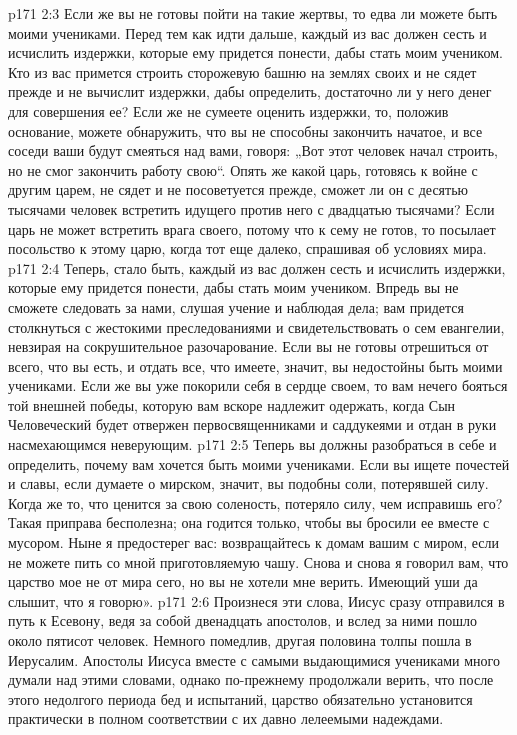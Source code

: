 \vs p171 2:3 Если же вы не готовы пойти на такие жертвы, то едва ли можете быть моими учениками. Перед тем как идти дальше, каждый из вас должен сесть и исчислить издержки, которые ему придется понести, дабы стать моим учеником. Кто из вас примется строить сторожевую башню на землях своих и не сядет прежде и не вычислит издержки, дабы определить, достаточно ли у него денег для совершения ее? Если же не сумеете оценить издержки, то, положив основание, можете обнаружить, что вы не способны закончить начатое, и все соседи ваши будут смеяться над вами, говоря: „Вот этот человек начал строить, но не смог закончить работу свою“. Опять же какой царь, готовясь к войне с другим царем, не сядет и не посоветуется прежде, сможет ли он с десятью тысячами человек встретить идущего против него с двадцатью тысячами? Если царь не может встретить врага своего, потому что к сему не готов, то посылает посольство к этому царю, когда тот еще далеко, спрашивая об условиях мира.
\vs p171 2:4 Теперь, стало быть, каждый из вас должен сесть и исчислить издержки, которые ему придется понести, дабы стать моим учеником. Впредь вы не сможете следовать за нами, слушая учение и наблюдая дела; вам придется столкнуться с жестокими преследованиями и свидетельствовать о сем евангелии, невзирая на сокрушительное разочарование. Если вы не готовы отрешиться от всего, что вы есть, и отдать все, что имеете, значит, вы недостойны быть моими учениками. Если же вы уже покорили себя в сердце своем, то вам нечего бояться той внешней победы, которую вам вскоре надлежит одержать, когда Сын Человеческий будет отвержен первосвященниками и саддукеями и отдан в руки насмехающимся неверующим.
\vs p171 2:5 Теперь вы должны разобраться в себе и определить, почему вам хочется быть моими учениками. Если вы ищете почестей и славы, если думаете о мирском, значит, вы подобны соли, потерявшей силу. Когда же то, что ценится за свою соленость, потеряло силу, чем исправишь его? Такая приправа бесполезна; она годится только, чтобы вы бросили ее вместе с мусором. Ныне я предостерег вас: возвращайтесь к домам вашим с миром, если не можете пить со мной приготовляемую чашу. Снова и снова я говорил вам, что царство мое не от мира сего, но вы не хотели мне верить. Имеющий уши да слышит, что я говорю».
\vs p171 2:6 \pc Произнеся эти слова, Иисус сразу отправился в путь к Есевону, ведя за собой двенадцать апостолов, и вслед за ними пошло около пятисот человек. Немного помедлив, другая половина толпы пошла в Иерусалим. Апостолы Иисуса вместе с самыми выдающимися учениками много думали над этими словами, однако по\hyp{}прежнему продолжали верить, что после этого недолгого периода бед и испытаний, царство обязательно установится практически в полном соответствии с их давно лелеемыми надеждами.
